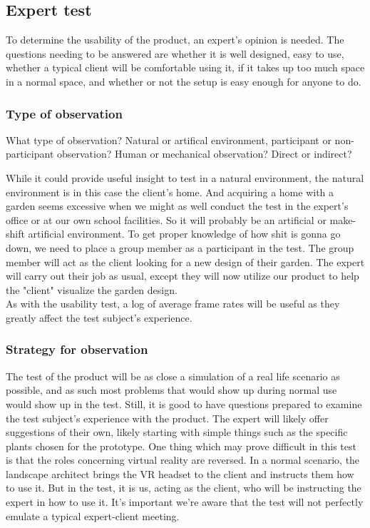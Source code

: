 \subsection{Expert test}
To determine the usability of the product, an expert's opinion is needed. The questions needing to be answered are whether it is well designed, easy to use, whether a typical client will be comfortable using it, if it takes up too much space in a normal space, and whether or not the setup is easy enough for anyone to do.
\subsubsection{Type of observation}
What type of observation? Natural or artifical environment, participant or non-participant observation?
Human or mechanical observation? Direct or indirect?

While it could provide useful insight to test in a natural environment, the natural environment is in this case the client's home. And acquiring a home with a garden seems excessive when we might as well conduct the test in the expert's office or at our own school facilities. So it will probably be an artificial or make-shift artificial environment. To get proper knowledge of how shit is gonna go down, we need to place a group member as a participant in the test. The group member will act as the client looking for a new design of their garden. The expert will carry out their job as usual, except they will now utilize our product to help the "client" visualize the garden design.\\
As with the usability test, a log of average frame rates will be useful as they greatly affect the test subject's experience. 

\subsubsection{Strategy for observation}
The test of the product will be as close a simulation of a real life scenario as possible, and as such most problems that would show up during normal use would show up in the test. Still, it is good to have questions prepared to examine the test subject's experience with the product. The expert will likely offer suggestions of their own, likely starting with simple things such as the specific plants chosen for the prototype. 
One thing which may prove difficult in this test is that the roles concerning virtual reality are reversed. In a normal scenario, the landscape architect brings the VR headset to the client and instructs them how to use it. But in the test, it is us, acting as the client, who will be instructing the expert in how to use it. It's important we're aware that the test will not perfectly emulate a typical expert-client meeting. 

